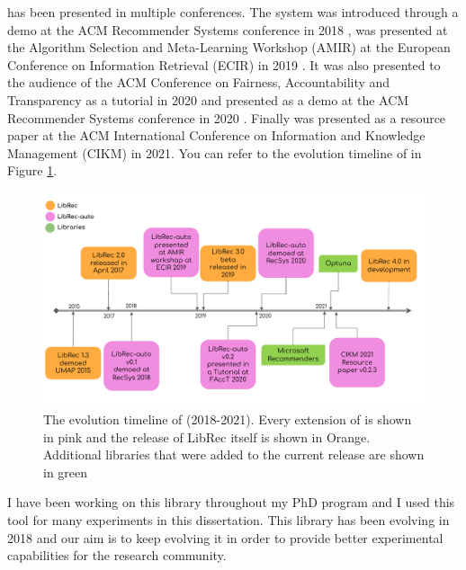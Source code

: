 \libauto{} has been presented in multiple conferences. The system was introduced through a demo at the ACM Recommender Systems conference in 2018 \cite{mansoury2018automating}, was presented at the Algorithm Selection and Meta-Learning Workshop (AMIR) at the European Conference on Information Retrieval (ECIR) in 2019 \cite{mansoury2019algorithm}. It was also presented to the audience of the ACM Conference on Fairness, Accountability and Transparency as a tutorial in 2020 \cite{burke2020facct_libauto} and presented as a demo at the ACM Recommender Systems conference in 2020 \cite{Sonboli2020FARLA}. Finally \libauto{} was presented as a resource paper at the ACM International Conference on Information and Knowledge Management (CIKM) in 2021. You can refer to the evolution timeline of \libauto{} in Figure \ref{fig:librec-auto-evolution}.



\begin{figure}[!htb]
    \centering
    \includegraphics[width=0.95\linewidth]{imgs/la/librec-auto-evolution.pdf}
    \caption{The evolution timeline of \libauto{} (2018-2021). Every extension of \libauto{} is shown in pink and the release of LibRec itself is shown in Orange. Additional libraries that were added to the current release are shown in green}
    \label{fig:librec-auto-evolution}
    \vspace{-0.15in}
\end{figure}

I have been working on this library throughout my PhD program and I used this tool for many experiments in this dissertation. 
This library has been evolving in 2018 and our aim is to keep evolving it in order to provide better experimental capabilities for the research community. 